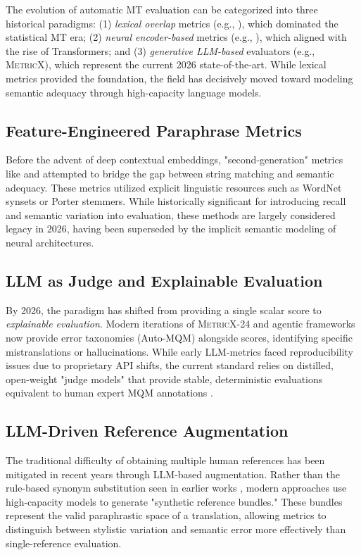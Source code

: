 The evolution of automatic MT evaluation can be categorized into three historical paradigms:
 (1) \textit{lexical overlap} metrics (e.g., \bleu), which dominated the statistical MT era;
 (2) \textit{neural encoder-based} metrics (e.g., \comet), which aligned with the rise of Transformers; and 
 (3) \textit{generative LLM-based} evaluators (e.g., \textsc{MetricX}), which represent the current 2026 state-of-the-art. While lexical metrics provided the foundation, the field has decisively moved toward modeling semantic adequacy through high-capacity language models.

 \subsection{Feature-Engineered Paraphrase Metrics}
Before the advent of deep contextual embeddings, "second-generation" metrics like \mn \citep{denkowski-lavie-2014-meteor} and \terp \citep{terp} attempted to bridge the gap between
string matching and semantic adequacy. These metrics utilized explicit linguistic resources 
such as WordNet synsets or Porter stemmers. While historically significant for introducing 
recall and semantic variation into evaluation, these methods are largely considered legacy 
in 2026, having been superseded by the implicit semantic modeling of neural architectures.

\subsection{LLM as Judge and Explainable Evaluation}
By 2026, the paradigm has shifted from providing a single scalar score to \textit{explainable evaluation}. Modern iterations of \textsc{MetricX-24} and agentic frameworks now provide error taxonomies (Auto-MQM) alongside scores, identifying specific mistranslations or hallucinations. While early LLM-metrics faced reproducibility issues due to proprietary API shifts, the current standard relies on distilled, open-weight "judge models" that provide stable, deterministic evaluations equivalent to human expert MQM annotations \citep{cui2025llmsscorersrethinkingmt}.

\subsection{LLM-Driven Reference Augmentation}
The traditional difficulty of obtaining multiple human references has been mitigated in recent years through LLM-based augmentation. Rather than the rule-based synonym substitution seen in earlier works \citep{kauchak}, modern approaches use high-capacity models to generate "synthetic reference bundles." These bundles represent the valid paraphrastic space of a translation, allowing metrics to distinguish between stylistic variation and semantic error more effectively than single-reference evaluation.